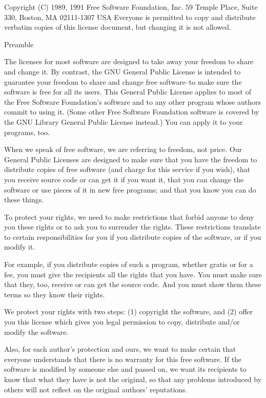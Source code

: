  Copyright (C) 1989, 1991 Free Software Foundation, Inc.
                       59 Temple Place, Suite 330, Boston, MA  02111-1307  USA
 Everyone is permitted to copy and distribute verbatim copies
 of this license document, but changing it is not allowed.

                            Preamble

  The licenses for most software are designed to take away your
freedom to share and change it.  By contrast, the GNU General Public
License is intended to guarantee your freedom to share and change free
software--to make sure the software is free for all its users.  This
General Public License applies to most of the Free Software
Foundation's software and to any other program whose authors commit to
using it.  (Some other Free Software Foundation software is covered by
the GNU Library General Public License instead.)  You can apply it to
your programs, too.

  When we speak of free software, we are referring to freedom, not
price.  Our General Public Licenses are designed to make sure that you
have the freedom to distribute copies of free software (and charge for
this service if you wish), that you receive source code or can get it
if you want it, that you can change the software or use pieces of it
in new free programs; and that you know you can do these things.

  To protect your rights, we need to make restrictions that forbid
anyone to deny you these rights or to ask you to surrender the rights.
These restrictions translate to certain responsibilities for you if you
distribute copies of the software, or if you modify it.

  For example, if you distribute copies of such a program, whether
gratis or for a fee, you must give the recipients all the rights that
you have.  You must make sure that they, too, receive or can get the
source code.  And you must show them these terms so they know their
rights.

  We protect your rights with two steps: (1) copyright the software, and
(2) offer you this license which gives you legal permission to copy,
distribute and/or modify the software.

  Also, for each author's protection and ours, we want to make certain
that everyone understands that there is no warranty for this free
software.  If the software is modified by someone else and passed on, we
want its recipients to know that what they have is not the original, so
that any problems introduced by others will not reflect on the original
authors' reputations.


